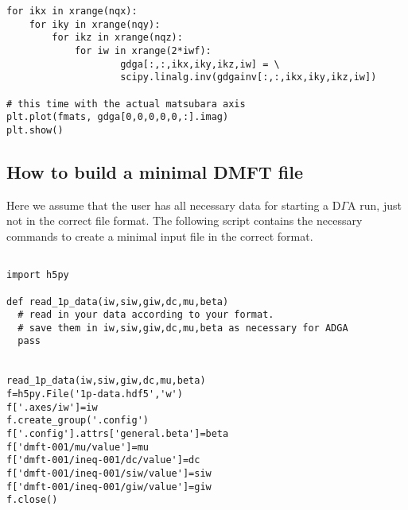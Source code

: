 \documentclass[a4paper,11pt]{article}
\numberwithin{equation}{section} %
\begin{document}
\begin{verbatim}
for ikx in xrange(nqx):                                                                                                                                                                                        
    for iky in xrange(nqy):                                                                                                                                                                                    
        for ikz in xrange(nqz):                                                                                                                                                                                
            for iw in xrange(2*iwf):                                                                                                                                                                           
                    gdga[:,:,ikx,iky,ikz,iw] = \
                    scipy.linalg.inv(gdgainv[:,:,ikx,iky,ikz,iw]) 

# this time with the actual matsubara axis
plt.plot(fmats, gdga[0,0,0,0,0,:].imag)
plt.show()
\end{verbatim}                    

\subsection*{How to build a minimal DMFT file}
Here we assume that the user has all necessary data for starting a D$\Gamma$A run,
just not in the correct file format. The following script contains the necessary 
commands to create a minimal input file in the correct format.

\begin{verbatim}

import h5py

def read_1p_data(iw,siw,giw,dc,mu,beta)
  # read in your data according to your format.
  # save them in iw,siw,giw,dc,mu,beta as necessary for ADGA
  pass


read_1p_data(iw,siw,giw,dc,mu,beta)
f=h5py.File('1p-data.hdf5','w')
f['.axes/iw']=iw 
f.create_group('.config')
f['.config'].attrs['general.beta']=beta
f['dmft-001/mu/value']=mu
f['dmft-001/ineq-001/dc/value']=dc
f['dmft-001/ineq-001/siw/value']=siw
f['dmft-001/ineq-001/giw/value']=giw
f.close()

\end{verbatim}
\end{document}
